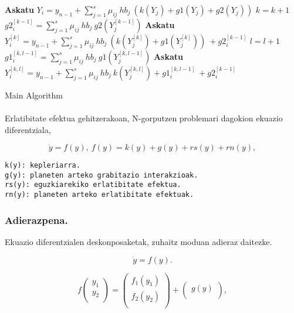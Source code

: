 \begin{algorithm}[H]
 \BlankLine
  \textbf{Askatu} $Y_i=y_{n-1}+ \sum\limits_{j=1}^{s} \mu_{ij} \ hb_j \ (k(Y_{j})+g1(Y_{j})+g2(Y_{j})) $\;
 \BlankLine
   {
    \BlankLine 
    $k=k+1$\;
    $g2_{i}^{[k-1]}=\sum\limits_{j=1}^{s} \mu_{ij} \ hb_j \ g2(Y_{j}^{[k-1]}) $\;
    \textbf{Askatu} $Y_i^{[k]}=y_{n-1}+ \sum\limits_{j=1}^{s} \mu_{ij} \ hb_j \ (k(Y_{j}^{[k]})+g1(Y_{j}^{[k]})) \ +g2_{i}^{[k-1]} $\;
       {
        \BlankLine 
         $l=l+1$\;
         $g1_{i}^{[k,l-1]}=\sum\limits_{j=1}^{s} \mu_{ij} \ hb_j \ g1(Y_{j}^{[k,l-1]}) $\;
         \textbf{Askatu} $Y_i^{[k,l]}=y_{n-1}+ \sum\limits_{j=1}^{s} \mu_{ij} \ hb_j \ k(Y_{j}^{[k,l]})+g1_{i}^{[k,l-1]} \ +g2_{i}^{[k-1]} $\;
       }
   }
   \BlankLine

 \caption{Main Algorithm}
\end{algorithm}

\paragraph*{}Erlatibitate efektua gehitzerakoan, N-gorputzen problemari dagokion ekuazio diferentziala,

\begin{equation*}
\dot{y}=f(y), \ f(y)=k(y)+g(y)+rs(y)+rn(y),
\end{equation*}

\begin{lstlisting}
k(y): kepleriarra.
g(y): planeten arteko grabitazio interakzioak.
rs(y): eguzkiarekiko erlatibitate efektua.
rn(y): planeten arteko erlatibitate efektuak.
\end{lstlisting}

\subsubsection*{Adierazpena.}

Ekuazio diferentzialen deskonposaketak, zuhaitz moduan adieraz daitezke.

\begin{equation*}
\dot{y}=f(y).
\end{equation*}


\begin{equation*}
f\left ( \begin{array}{c}
   y_1 \\
   y_2 \\
\end{array} \right)=
\left ( \begin{array}{c}
   f_1(y_1) \\
   f_2(y_2) \\
\end{array} \right)+
\left ( \begin{array}{c}
   g(y) \\
\end{array} \right),
\end{equation*}

